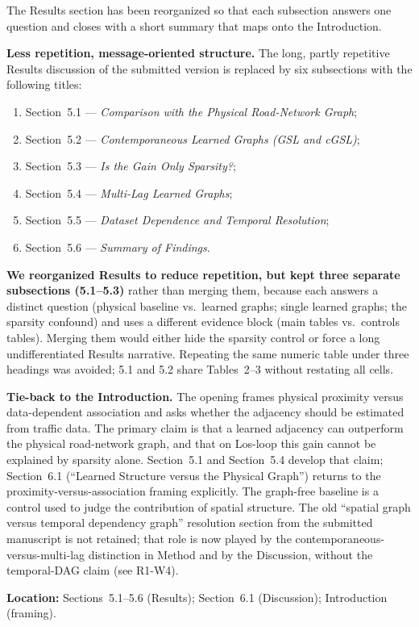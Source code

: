 \documentclass[a4paper,11pt]{article}
\newcommand{\response}[1]{%
    \begin{myresponse}
        #1
    \end{myresponse}
    \vspace{5mm}
}
\begin{document}
\response{
The Results section has been reorganized so that each subsection answers one question and closes with a short summary that maps onto the Introduction.

\textbf{Less repetition, message-oriented structure.} The long, partly repetitive Results discussion of the submitted version is replaced by six subsections with the following titles:
\begin{enumerate}
    \item Section~5.1 --- \emph{Comparison with the Physical Road-Network Graph};
    \item Section~5.2 --- \emph{Contemporaneous Learned Graphs (GSL and cGSL)};
    \item Section~5.3 --- \emph{Is the Gain Only Sparsity?};
    \item Section~5.4 --- \emph{Multi-Lag Learned Graphs};
    \item Section~5.5 --- \emph{Dataset Dependence and Temporal Resolution};
    \item Section~5.6 --- \emph{Summary of Findings}.
\end{enumerate}

\textbf{We reorganized Results to reduce repetition, but kept three separate subsections (5.1--5.3)} rather than merging them, because each answers a distinct question (physical baseline vs.\ learned graphs; single learned graphs; the sparsity confound) and uses a different evidence block (main tables vs.\ controls tables). Merging them would either hide the sparsity control or force a long undifferentiated Results narrative. Repeating the same numeric table under three headings was avoided; 5.1 and 5.2 share Tables~2--3 without restating all cells.

\textbf{Tie-back to the Introduction.} The opening frames physical proximity versus data-dependent association and asks whether the adjacency should be estimated from traffic data. The primary claim is that a learned adjacency can outperform the physical road-network graph, and that on Los-loop this gain cannot be explained by sparsity alone. Section~5.1 and Section~5.4 develop that claim; Section~6.1 (``Learned Structure versus the Physical Graph'') returns to the proximity-versus-association framing explicitly. The graph-free baseline is a control used to judge the contribution of spatial structure.
 The old ``spatial graph versus temporal dependency graph'' resolution section from the submitted manuscript is not retained; that role is now played by the contemporaneous-versus-multi-lag distinction in Method and by the Discussion, without the temporal-DAG claim (see R1-W4).

\textbf{Location:} Sections~5.1--5.6 (Results); Section~6.1 (Discussion); Introduction (framing).
}
\end{document}
